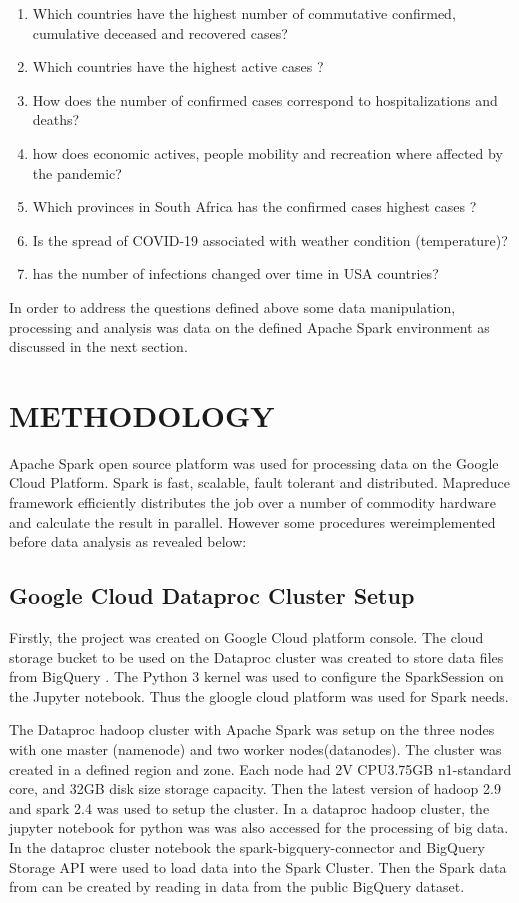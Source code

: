\documentclass[12pt]{article}
\begin{document}
\begin{enumerate}
    \item Which  countries have the highest number of commutative confirmed, cumulative deceased and recovered cases?
    \item  Which countries have the highest active cases ?
    \item How does the number of confirmed cases correspond to hospitalizations and deaths?
    \item how does economic actives, people mobility and recreation where affected by the pandemic?
    \item Which provinces in South Africa has the  confirmed cases highest cases ?
    \item Is the spread of COVID-19 associated with weather condition (temperature)?
    \item has the number of infections changed over time in  USA countries?
\end{enumerate}

In order to address the questions  defined above  some  data manipulation, processing and analysis was data on the defined Apache Spark environment as discussed in the next section.

\section{METHODOLOGY}
Apache Spark open source platform was used for processing data on the Google Cloud Platform. Spark is fast, scalable, fault tolerant and distributed. Mapreduce framework efficiently distributes the job over a number of commodity hardware and calculate the result in parallel. However some procedures wereimplemented before data analysis as revealed below:

\subsection{ Google Cloud Dataproc Cluster Setup}
Firstly, the project was created on Google Cloud platform console. The cloud storage bucket to be used on the Dataproc cluster was created to store data files from BigQuery . The Python 3 kernel was used to configure the SparkSession on the Jupyter notebook.  Thus the gloogle cloud platform was used for Spark needs.

The Dataproc hadoop cluster with Apache Spark was setup on the three nodes with one master (namenode) and two worker nodes(datanodes). The cluster was created in a defined region and zone. Each node had 2V CPU3.75GB n1-standard core, and 32GB disk size storage capacity. Then the latest version of hadoop 2.9 and spark 2.4 was used to setup the cluster. In a dataproc hadoop cluster, the jupyter notebook for python was was also accessed for the processing of big data.  In the dataproc cluster notebook the spark-bigquery-connector and BigQuery Storage API were used to  load data into the Spark Cluster. Then the Spark data from can be created by reading in data from the public BigQuery dataset. 
\end{document}
